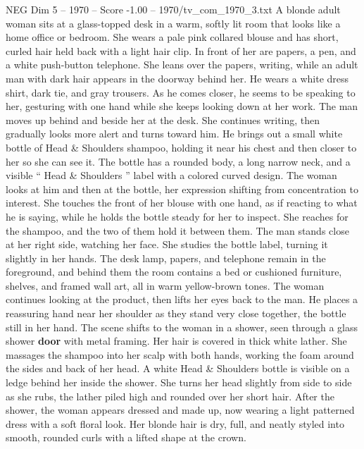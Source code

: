 \begin{textsample}{NEG Dim 5 – 1970 – Score -1.00 – 1970/tv\_com\_1970\_3.txt}  \label{ex:f5_neg_013}
A blonde adult woman sits at a glass-topped desk in a warm, softly lit room that looks like a home office or bedroom.
She wears a pale pink collared blouse and has short, curled hair held back with a light hair clip.
In front of her are papers, a pen, and a white push-button telephone.
She leans over the papers, writing, while an adult man with dark hair appears in the doorway behind her.
He wears a white dress shirt, dark tie, and gray trousers.
As he comes closer, he seems to be speaking to her, gesturing with one hand while she keeps looking down at her work.
The man moves up behind and beside her at the desk.
She continues writing, then gradually looks more alert and turns toward him.
He brings out a small white bottle of Head \& Shoulders shampoo, holding it near his chest and then closer to her so she can see it.
The bottle has a rounded body, a long narrow neck, and a visible “ Head \& Shoulders ” label with a colored curved design.
The woman looks at him and then at the bottle, her expression shifting from concentration to interest.
She touches the front of her blouse with one hand, as if reacting to what he is saying, while he holds the bottle steady for her to inspect.
She reaches for the shampoo, and the two of them hold it between them.
The man stands close at her right side, watching her face.
She studies the bottle label, turning it slightly in her hands.
The desk lamp, papers, and telephone remain in the foreground, and behind them the room contains a bed or cushioned furniture, shelves, and framed wall art, all in warm yellow-brown tones.
The woman continues looking at the product, then lifts her eyes back to the man.
He places a reassuring hand near her shoulder as they stand very close together, the bottle still in her hand.
The scene shifts to the woman in a shower, seen through a glass shower \textbf{door} with metal framing.
Her hair is covered in thick white lather.
She massages the shampoo into her scalp with both hands, working the foam around the sides and back of her head.
A white Head \& Shoulders bottle is visible on a ledge behind her inside the shower.
She turns her head slightly from side to side as she rubs, the lather piled high and rounded over her short hair.
After the shower, the woman appears dressed and made up, now wearing a light patterned dress with a soft floral look.
Her blonde hair is dry, full, and neatly styled into smooth, rounded curls with a lifted shape at the crown.

\end{textsample}

